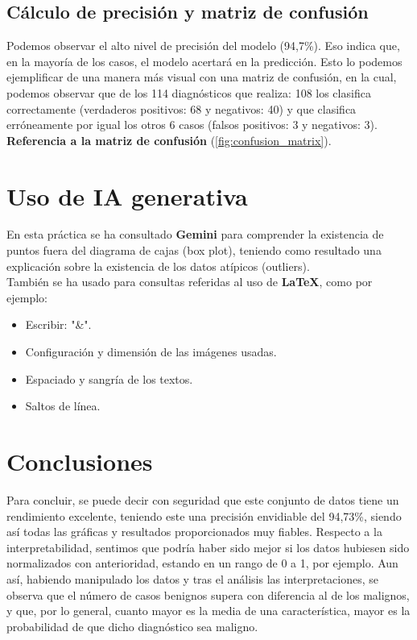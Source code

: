 \documentclass{llncs}
\begin{document}
\subsection{Cálculo de precisión y matriz de confusión}

{Podemos observar el alto nivel de precisión del modelo (94,7\%). Eso indica que, en la mayoría de los casos, el modelo acertará en la predicción. Esto lo podemos ejemplificar de una manera más visual con una matriz de confusión, en la cual, podemos observar que de los 114 diagnósticos que realiza: 108 los clasifica correctamente (verdaderos positivos: 68 y negativos: 40) y que clasifica erróneamente por igual los otros 6 casos (falsos positivos: 3 y negativos: 3).}
\\\textbf{Referencia a la matriz de confusión }(\ref{fig:confusion_matrix}).

\section{Uso de IA generativa}

{En esta práctica se ha consultado \textbf{Gemini} para comprender la existencia de puntos fuera del diagrama de cajas (box plot), teniendo como resultado una explicación sobre la existencia de los datos atípicos (outliers). \\También se ha usado para consultas referidas al uso de \textbf{LaTeX}, como por ejemplo:}

\begin{itemize}
  \item Escribir: "\&".
  \item Configuración y dimensión de las imágenes usadas.
  \item Espaciado y sangría de los textos.
  \item Saltos de línea.
\end{itemize}

\section{Conclusiones}
{Para concluir, se puede decir con seguridad que este conjunto de datos tiene un rendimiento excelente, teniendo este una precisión envidiable del 94,73\%, siendo así todas las gráficas y resultados proporcionados muy fiables. Respecto a la interpretabilidad, sentimos que podría haber sido mejor si los datos hubiesen sido normalizados con anterioridad, estando en un rango de 0 a 1, por ejemplo. Aun así, habiendo manipulado los datos y tras el análisis las interpretaciones, se observa que el número de casos benignos supera con diferencia al de los malignos, y que, por lo general, cuanto mayor es la media de una característica, mayor es la probabilidad de que dicho diagnóstico sea maligno.}
    
\end{document}
